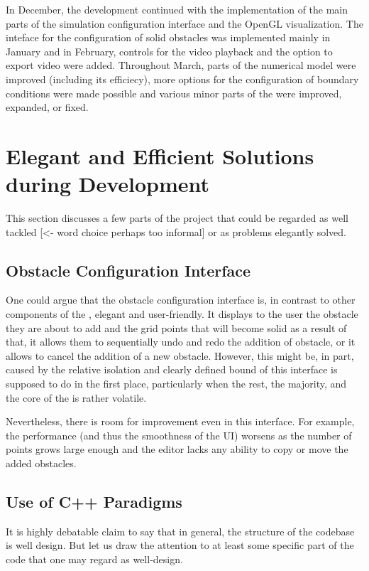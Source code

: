\documentclass[11pt,a4paper,twoside,openright]{report}
\begin{document}
In December, the development continued with the implementation of the main parts of the simulation configuration interface and the OpenGL visualization. The inteface for the configuration of solid obstacles was implemented mainly in January and in February, controls for the video playback and the option to export video were added. Throughout March, parts of the numerical model were improved (including its efficiecy), more options for the configuration of boundary conditions were made possible and various minor parts of the \software{} were improved, expanded, or fixed.

\section{Elegant and Efficient Solutions during Development}
This section discusses a few parts of the project that could be regarded as well tackled [<- word choice perhaps too informal] or as problems elegantly solved.

\subsection{Obstacle Configuration Interface}
One could argue that the obstacle configuration interface is, in contrast to other components of the \software{}, elegant and user-friendly. It displays to the user the obstacle they are about to add and the grid points that will become solid as a result of that, it allows them to sequentially undo and redo the addition of obstacle, or it allows to cancel the addition of a new obstacle. However, this might be, in part, caused by the relative isolation and clearly defined bound of this interface is supposed to do in the first place, particularly when the rest, the majority, and the core of the \software{} is rather volatile.

Nevertheless, there is room for improvement even in this interface. For example, the performance (and thus the smoothness of the UI) worsens as the number of points grows large enough and the editor lacks any ability to copy or move the added obstacles.

\subsection{Use of C++ Paradigms}
It is highly debatable claim to say that in general, the structure of the codebase is well design. But let us draw the attention to at least some specific part of the code that one may regard as well-design.
\end{document}
